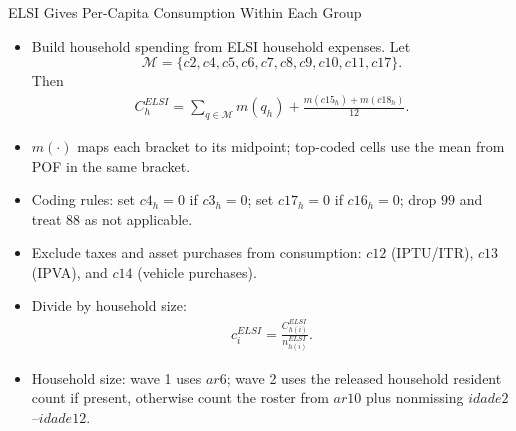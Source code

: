 \begin{frame}[label=elsiConsumption]{ELSI Gives Per-Capita Consumption Within Each Group}
    \footnotesize
    \begin{itemize}
        \item Build household spending from ELSI household expenses. Let
        \[
            \mathcal M=\{c2,c4,c5,c6,c7,c8,c9,c10,c11,c17\}.
        \]
        Then
        \begin{align*}
            C_h^{ELSI}
            =
            \sum_{q\in\mathcal M}m(q_h)
            +
            \frac{m(c15_h)+m(c18_h)}{12}.
        \end{align*}
        \item $m(\cdot)$ maps each bracket to its midpoint; top-coded cells use the mean from POF in the same bracket.
        \item Coding rules: set $c4_h=0$ if $c3_h=0$; set $c17_h=0$ if $c16_h=0$; drop $99$ and treat $88$ as not applicable.
        \item Exclude taxes and asset purchases from consumption: $c12$ (IPTU/ITR), $c13$ (IPVA), and $c14$ (vehicle purchases).
        \item Divide by household size:
        \begin{align*}
            c_i^{ELSI}=\frac{C_{h(i)}^{ELSI}}{n_{h(i)}^{ELSI}}.
        \end{align*}
        \item Household size: wave 1 uses $ar6$; wave 2 uses the released household resident count if present, otherwise count the roster from $ar10$ plus nonmissing $idade2$--$idade12$.
    \end{itemize}
\end{frame}

